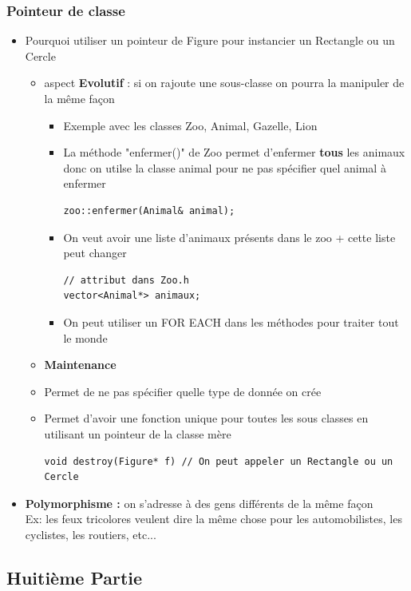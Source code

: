 \documentclass[12pt,a4paper]{article}
\begin{document}
\subsubsection{Pointeur de classe}
\begin{itemize}
\item Pourquoi utiliser un pointeur de Figure pour instancier un Rectangle ou un Cercle
\begin{itemize}
\item aspect \textbf{Evolutif} : si on rajoute une sous-classe on pourra la manipuler de la même façon 
\begin{itemize}
\item Exemple avec les classes Zoo, Animal, Gazelle, Lion
\item La méthode "enfermer()" de Zoo permet d'enfermer \textbf{tous} les animaux donc on utilse la classe animal pour ne pas spécifier quel animal à enfermer
\begin{lstlisting}
zoo::enfermer(Animal& animal);
\end{lstlisting}
\item On veut avoir une liste d'animaux présents dans le zoo + cette liste peut changer
\begin{lstlisting}
// attribut dans Zoo.h
vector<Animal*> animaux;
\end{lstlisting}
\item On peut utiliser un FOR EACH dans les méthodes pour traiter tout le monde
\end{itemize}
\item \textbf{Maintenance}
\item Permet de ne pas spécifier quelle type de donnée on crée
\item Permet d'avoir une fonction unique pour toutes les sous classes en utilisant un pointeur de la classe mère
\begin{lstlisting}
void destroy(Figure* f) // On peut appeler un Rectangle ou un Cercle
\end{lstlisting}
\end{itemize}
\item \textbf{Polymorphisme :} on s'adresse à des gens différents de la même façon\\
Ex: les feux tricolores veulent dire la même chose pour les automobilistes, les cyclistes, les routiers, etc...
\end{itemize}

\subsection{Huitième Partie}
\end{document}
